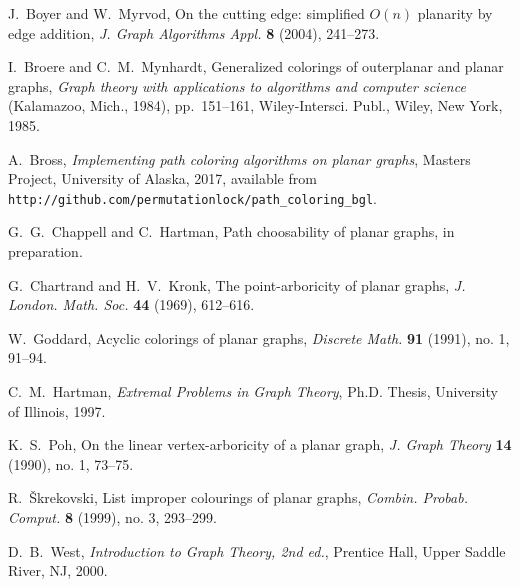 \documentclass[12pt,letterpaper]{article}
\theoremstyle{plain}
\theoremstyle{definition}
\theoremstyle{break}
\begin{document}
\begin{thebibliography}{99}

J.~Boyer and W.~Myrvod, On the cutting edge: simplified $O(n)$ planarity by edge
addition,
\textit{J. Graph Algorithms Appl.}
\textbf{8} (2004),
241--273.

I.~Broere and C.~M.~Mynhardt,
Generalized colorings of outerplanar and planar graphs,
\textit{Graph theory with applications to algorithms and computer science}
 (Kalamazoo, Mich., 1984),
pp.~151--161,
Wiley-Intersci. Publ., Wiley, New York, 1985.

A.~Bross,
\textit{Implementing path coloring algorithms on planar graphs},
Masters Project,
University of Alaska,
2017,
available from\hfil\break
\texttt{http://github.com/permutationlock/path\_coloring\_bgl}.

G.~G.~Chappell and C.~Hartman,
Path choosability of planar graphs,
in preparation.

G.~Chartrand and H.~V.~Kronk,
The point-arboricity of planar graphs,
\textit{J. London. Math. Soc.}
\textbf{44} (1969),
612--616.

W.~Goddard,
Acyclic colorings of planar graphs,
\textit{Discrete Math.}
\textbf{91} (1991), no. 1,
91--94.

C.~M.~Hartman,
\textit{Extremal Problems in Graph Theory},
Ph.D. Thesis,
University of Illinois,
1997.

K.~S.~Poh,
On the linear vertex-arboricity of a planar graph,
\textit{J. Graph Theory}
\textbf{14} (1990), no. 1,
73--75.

R.~\v{S}krekovski,
List improper colourings of planar graphs,
\textit{Combin. Probab. Comput.}
\textbf{8} (1999), no. 3,
293--299.

D.~B.~West,
\textit{Introduction to Graph Theory, 2nd ed.},
Prentice Hall,
Upper Saddle River, NJ,
2000.

\end{thebibliography}
\end{document}
